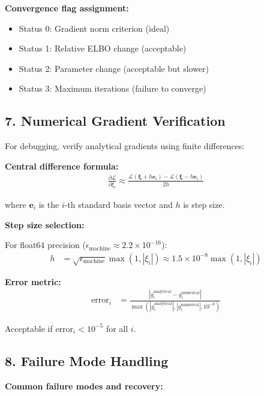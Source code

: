 \documentclass[11pt,a4paper]{article}
\begin{document}
\textbf{Convergence flag assignment:}
\begin{itemize}
\item Status 0: Gradient norm criterion (ideal)
\item Status 1: Relative ELBO change (acceptable)
\item Status 2: Parameter change (acceptable but slower)
\item Status 3: Maximum iterations (failure to converge)
\end{itemize}

\subsection*{7. Numerical Gradient Verification}

For debugging, verify analytical gradients using finite differences:

\textbf{Central difference formula:}
\begin{align}
\frac{\partial \mathcal{L}}{\partial \xi_i} \approx \frac{\mathcal{L}(\bm{\xi} + h \bm{e}_i) - \mathcal{L}(\bm{\xi} - h \bm{e}_i)}{2h}
\end{align}

where $\bm{e}_i$ is the $i$-th standard basis vector and $h$ is step size.

\textbf{Step size selection:}

For float64 precision ($\epsilon_{\text{machine}} \approx 2.2 \times 10^{-16}$):
\begin{align}
h &= \sqrt{\epsilon_{\text{machine}}} \max(1, |\xi_i|) \approx 1.5 \times 10^{-8} \max(1, |\xi_i|)
\end{align}

\textbf{Error metric:}
\begin{align}
\text{error}_i &= \frac{|g_i^{\text{analytical}} - g_i^{\text{numerical}}|}{\max(|g_i^{\text{analytical}}|, |g_i^{\text{numerical}}|, 10^{-8})}
\end{align}

Acceptable if $\text{error}_i < 10^{-5}$ for all $i$.

\subsection*{8. Failure Mode Handling}

\textbf{Common failure modes and recovery:}
\end{document}
